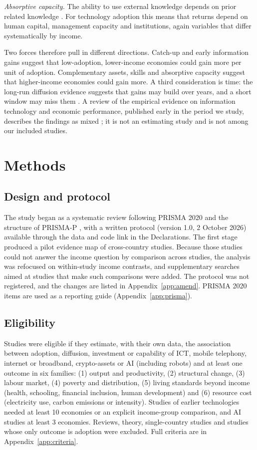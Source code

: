 \documentclass[11pt,a4paper]{article}
\begin{document}
\emph{Absorptive capacity.} The ability to use external knowledge depends on prior related knowledge \cite{cohen1990}. For technology adoption this means that returns depend on human capital, management capacity and institutions, again variables that differ systematically by income.

Two forces therefore pull in different directions. Catch-up and early information gains suggest that low-adoption, lower-income economies could gain more per unit of adoption. Complementary assets, skills and absorptive capacity suggest that higher-income economies could gain more. A third consideration is time: the long-run diffusion evidence suggests that gains may build over years, and a short window may miss them \cite{comin2018}. A review of the empirical evidence on information technology and economic performance, published early in the period we study, describes the findings as mixed \cite{dedrick2003}; it is not an estimating study and is not among our included studies.


\section{Methods}\label{sec:methods}

\subsection{Design and protocol}
The study began as a systematic review following PRISMA 2020 \cite{prisma2020} and the structure of PRISMA-P \cite{prismap}, with a written protocol (version 1.0, 2 October 2026) available through the data and code link in the Declarations. The first stage produced a pilot evidence map of cross-country studies. Because those studies could not answer the income question by comparison across studies, the analysis was refocused on within-study income contrasts, and supplementary searches aimed at studies that make such comparisons were added. The protocol was not registered, and the changes are listed in Appendix~\ref{app:amend}. PRISMA 2020 items are used as a reporting guide (Appendix~\ref{app:prisma}).

\subsection{Eligibility}
Studies were eligible if they estimate, with their own data, the association between adoption, diffusion, investment or capability of ICT, mobile telephony, internet or broadband, crypto-assets or AI (including robots) and at least one outcome in six families: (1) output and productivity, (2) structural change, (3) labour market, (4) poverty and distribution, (5) living standards beyond income (health, schooling, financial inclusion, human development) and (6) resource cost (electricity use, carbon emissions or intensity). Studies of earlier technologies needed at least 10 economies or an explicit income-group comparison, and AI studies at least 3 economies. Reviews, theory, single-country studies and studies whose only outcome is adoption were excluded. Full criteria are in Appendix~\ref{app:criteria}.
\end{document}
